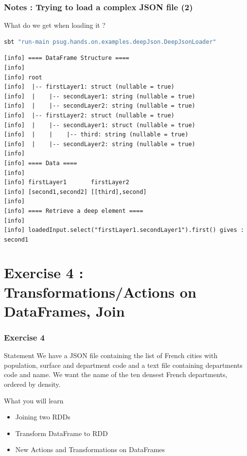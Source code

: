 \documentclass[slidetop,9pt,utf8]{beamer}
\begin{document}
\begin{frame}[fragile]

  \frametitle{Notes : Trying to load a complex JSON file (2)}

  \begin{exampleblock}{What do we get when loading it ?}
    \begin{lstlisting}[language=bash, style=terminal-medium]
sbt "run-main psug.hands.on.examples.deepJson.DeepJsonLoader"
    \end{lstlisting}

    \begin{lstlisting}[style=terminal]
[info] ==== DataFrame Structure ====
[info] 
[info] root
[info]  |-- firstLayer1: struct (nullable = true)
[info]  |    |-- secondLayer1: string (nullable = true)
[info]  |    |-- secondLayer2: string (nullable = true)
[info]  |-- firstLayer2: struct (nullable = true)
[info]  |    |-- secondLayer1: struct (nullable = true)
[info]  |    |    |-- third: string (nullable = true)
[info]  |    |-- secondLayer2: string (nullable = true)
[info] 
[info] ==== Data ====
[info] 
[info] firstLayer1       firstLayer2     
[info] [second1,second2] [[third],second]
[info] 
[info] ==== Retrieve a deep element ====
[info] 
[info] loadedInput.select("firstLayer1.secondLayer1").first() gives : second1
    \end{lstlisting}

  \end{exampleblock}

\end{frame}

%
%
%
%

\section{Exercise 4 : Transformations/Actions on DataFrames, Join}

\begin{frame}
  \frametitle{Exercise 4}

  \begin{block}{Statement}
    We have a JSON file containing the list of French cities with population, surface and department code and a text file containing departments code and name. We want the name of the ten densest French departments, ordered by density.
  \end{block}

  \begin{block}{What you will learn}
    \begin{itemize}
      \item Joining two RDDs
      \item Transform DataFrame to RDD
      \item New Actions and Transformations on DataFrames
    \end{itemize}
  \end{block}

\end{frame}
\end{document}
